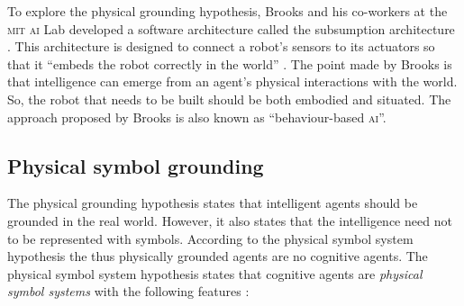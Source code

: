 To explore the physical grounding hypothesis, Brooks and his co-workers at the {\scshape mit ai} Lab developed a software architecture called the {\sc subsumption architecture} \citep{brooks:1986}. This architecture is designed to connect a robot's sensors to its actuators so that it ``embeds the robot correctly in the world'' \citep{brooks:1990}.  The point made by Brooks is that intelligence can emerge from an agent's physical interactions with the world. So, the robot that needs to be built should be both embodied and situated. The approach proposed by Brooks is also known as ``behaviour-based {\scshape ai}''.


\subsection{Physical symbol grounding}

The physical grounding hypothesis \citep{brooks:1990} states that intelligent agents should be grounded in the real world. However, it also states that the intelligence need not to be represented with symbols. According to the physical symbol system hypothesis the thus physically grounded agents are no cognitive agents. The physical symbol system hypothesis \citep{newell:1980} states that cognitive agents are {\em physical symbol systems} with the following features \citep[77]{newell:1990}:

